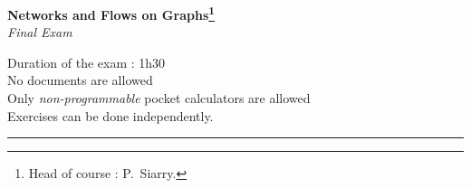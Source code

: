 \documentclass[12pt,a4paper]{article}
\begin{document}
\begin{center}
  
  {\Large \textbf{Networks and Flows on Graphs\footnote{Head of course : P.~Siarry.}}}\\

  \vspace{10pt}
  {\Large \textit{Final Exam}}

  \vspace{2\baselineskip}
\end{center}
\begin{center}
\begin{minipage}{\textwidth}
  Duration of the exam : 1h30\\
  No documents are allowed\\
  Only \emph{non-programmable} pocket calculators are allowed\\
  Exercises can be done independently.
\end{minipage}
\end{center}
\rule{\textwidth}{2pt}


\vspace{\baselineskip}
\end{document}
